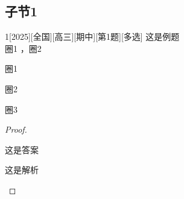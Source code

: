 \documentclass[
showanswers,        %
answercolor=red,    %
paper=a4,           %
sectioncolor=cyan,  %
subsectioncolor=cyan,
exercisecolor=orange, %
examplecolor=cyan,    %
bianshicolor=purple   %
]{biscuits}
\begin{document}
	\subsection{子节1}
	\begin{example}{1}[2025][全国][高三][期中][第1题][多选]
		这是例题\\
		圈1  ，圈2
		\begin{quan}
			\item 圈1
			\item 圈2
			\item 圈3
		\end{quan}
		\begin{choices}
		\end{choices}
		
		\begin{proof}
			\begin{answer}
				这是答案
			\end{answer}
			
			\begin{solutions}
				这是解析  
			\end{solutions} 
		\end{proof}
	\end{example}
\end{document}
